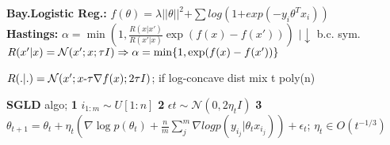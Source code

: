 \textbf{Bay.Logistic Reg.:} $f(\theta) = \lambda||\theta||^2 \text{+} \sum log(1 \text{+} exp(- y_i \theta^T x_i))$\\

\textbf{Hastings:} $\alpha = \min (1, \frac{R(x|x')}{R(x'|x)}\exp(f(x) - f(x')))$ $| \downarrow$ b.c. sym.\\
$R(x'|x) = \mathcal{N}(x';x;\tau I) \Rightarrow \alpha = \min \{ 1, \exp(f(x) - f(x')) \}$\\
\begin{comment}
	The R-fraction is 1, since Gaussians are symmetric.\\
	$f(x') < f(x)$: we accept with probability 1 if the cost function is smaller at x'.\\
	$f(x') > f(x)$: cost of new position is higher, still there is a possibility to go into this direction if not too high.\\
	\textbf{Note:} The Algo could get stuck.\\
\end{comment}

$R(.|.) = \mathcal{N}(x';x \text{-} \tau \nabla f(x);2\tau I)$; if log-concave dist mix t poly(n)\\
\begin{comment}
	MALA incorporates Langevin dynamics. We sample R in direction of the Mode of the energy function, this can help with the direction.\\
	Gradient computation can be expensive, there is a version where stochastic gradients are used.\\
\end{comment}

\textbf{SGLD}
algo; \textbf{1} $i_{1:m} \sim U[{1:n}]$ \textbf{2} $\epsilon{t} \sim \mathcal{N}(0, 2\eta_t I)$ \textbf{3} $\theta_{t+1} = \theta_t + \eta_t (\nabla \log p(\theta_t) + \frac{n}{m} \sum_j^m \nabla log p(y_{i_j} | \theta_t x_{i_j})) + \epsilon_t$; $\eta_t \in O(t^{-1/3})$